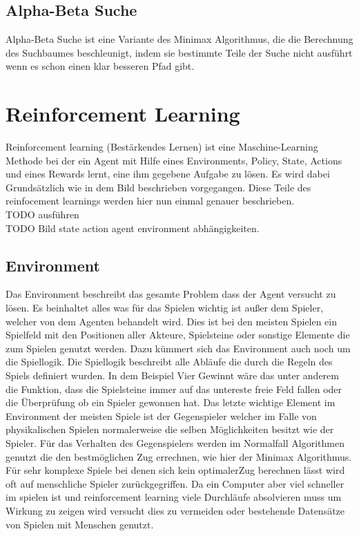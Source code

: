 \subsection{Alpha-Beta Suche}
Alpha-Beta Suche ist eine Variante des Minimax Algorithmus, die die Berechnung des Suchbaumes beschleunigt, indem sie bestimmte Teile der Suche nicht ausführt wenn es schon einen klar besseren Pfad gibt.

\section{Reinforcement Learning}
Reinforcement learning (Bestärkendes Lernen) ist eine Maschine-Learning Methode bei der ein Agent mit Hilfe eines Environments, Policy, State, Actions und eines Rewards lernt, eine ihm gegebene Aufgabe zu lösen. Es wird dabei Grundsätzlich wie in dem  \colorbox{red!30}{Bild} beschrieben vorgegangen. Diese Teile des reinfocement learnings werden hier nun einmal genauer beschrieben.\\
 \colorbox{red!30}{TODO ausführen}\\
\colorbox{red!30}{TODO Bild state action agent environment abhängigkeiten}.

\subsection{Environment}
Das Environment beschreibt das gesamte Problem dass der Agent versucht zu lösen. Es beinhaltet alles was für das Spielen wichtig ist außer dem Spieler, welcher von dem Agenten behandelt wird.  Dies ist bei den meisten Spielen ein Spielfeld mit den Positionen aller Akteure, Spielsteine oder sonstige Elemente die zum Spielen genutzt werden. Dazu kümmert sich das Environment auch noch um die Spiellogik. Die Spiellogik beschreibt alle Abläufe die durch die Regeln des Spiels definiert wurden. In dem Beispiel Vier Gewinnt wäre das unter anderem die Funktion, dass die Spielsteine immer auf das untereste freie Feld fallen oder die Überprüfung ob ein Spieler gewonnen hat. Das letzte wichtige Element im Environment der meisten Spiele ist der Gegenspieler welcher im Falle von physikalischen Spielen normalerweise die selben Möglichkeiten besitzt wie der Spieler. Für das Verhalten des Gegenspielers werden im Normalfall Algorithmen genutzt die den bestmöglichen Zug errechnen, wie hier der Minimax Algorithmus. Für sehr komplexe Spiele bei denen sich kein optimalerZug berechnen lässt wird oft auf menschliche Spieler zurückgegriffen. Da ein Computer aber viel schneller im spielen ist und reinforcement learning viele Durchläufe absolvieren muss um Wirkung zu zeigen wird versucht dies zu vermeiden oder bestehende Datensätze von Spielen mit Menschen genutzt.\\


